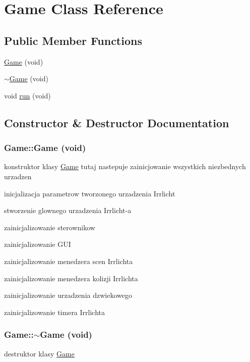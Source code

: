 \hypertarget{class_game}{
\section{Game Class Reference}
\label{class_game}
}
\subsection*{Public Member Functions}
\begin{DoxyCompactItemize}
\item 
\hyperlink{class_game_a3ae96cfdab80ddfed4e942b23c59cfd9}{Game} (void)
\item 
\hyperlink{class_game_a5132fe2c0d2a41ad6b613dc2baeca24c}{$\sim$Game} (void)
\item 
void \hyperlink{class_game_a46165f87463fa8114fa44596ced90dbd}{run} (void)
\end{DoxyCompactItemize}


\subsection{Constructor \& Destructor Documentation}
\hypertarget{class_game_a3ae96cfdab80ddfed4e942b23c59cfd9}{
\subsubsection[{Game}]{\setlength{\rightskip}{0pt plus 5cm}Game::Game (void)}}
\label{class_game_a3ae96cfdab80ddfed4e942b23c59cfd9}
konstruktor klasy \hyperlink{class_game}{Game} tutaj nastepuje zainicjowanie wszystkich niezbednych urzadzen 

inicjalizacja parametrow tworzonego urzadzenia Irrlicht

stworzenie glownego urzadzenia Irrlicht-\/a

zainicjalizowanie sterownikow

zainicjalizowanie GUI

zainicjalizowanie menedzera scen Irrlichta

zainicjalizowanie menedzera kolizji Irrlichta

zainicjalizowanie urzadzenia dzwiekowego

zainicjalizowanie timera Irrlichta \hypertarget{class_game_a5132fe2c0d2a41ad6b613dc2baeca24c}{
\subsubsection[{$\sim$Game}]{\setlength{\rightskip}{0pt plus 5cm}Game::$\sim$Game (void)}}
\label{class_game_a5132fe2c0d2a41ad6b613dc2baeca24c}
destruktor klasy \hyperlink{class_game}{Game} 

